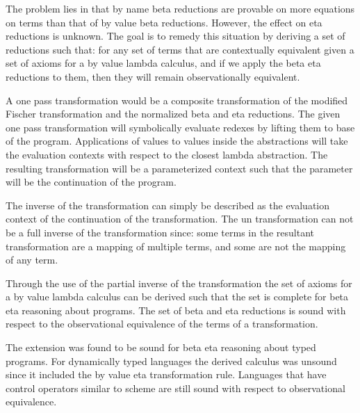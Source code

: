 The problem lies in that by name beta reductions are provable on more equations on \cps terms than that of by value beta reductions.  However, the effect on eta reductions is unknown. The goal is to remedy this situation by deriving a set of reductions such that: for any set of terms that are contextually equivalent given a set of axioms for a by value lambda calculus, and if we apply the beta eta reductions to them, then they will remain observationally equivalent.

A one pass \cps transformation would be a composite transformation of the modified Fischer transformation and the normalized beta and eta reductions.  The given one pass transformation will symbolically evaluate redexes by lifting them to base of the program. Applications of values to values inside the abstractions will take the evaluation contexts with respect to the closest lambda abstraction. The resulting transformation will be a parameterized context such that the parameter will be the continuation of the program.

The inverse of the \cps transformation can simply be described as the evaluation context of the continuation of the \cps transformation. The un \cps transformation can not be a full inverse of the \cps transformation since:  some terms in the resultant transformation are a mapping of multiple terms, and some are not the mapping of any term.

Through the use of the partial inverse of the \cps transformation the set of axioms for a by value lambda calculus can be derived such that the set is complete for beta eta reasoning about \cps programs.  The set of beta and eta reductions is sound with respect to the observational equivalence of the terms of a \cps transformation.

The extension was found to be sound for beta eta reasoning about typed \cps programs.  For dynamically typed languages the derived calculus
was unsound since it included the by value eta transformation rule.  Languages that have control operators similar to scheme are still sound
with respect to observational equivalence.



